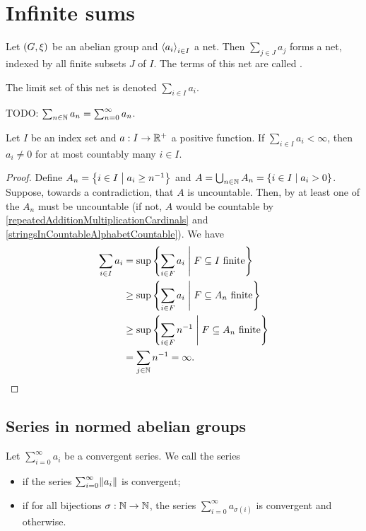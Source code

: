 \section{Infinite sums}
\begin{definition}
Let $\left( G,\xi \right)$ be an abelian group and $\left\langle a_i \right\rangle_{i\in I}$ a net. Then $\sum_{j\in J}a_j$ forms a net, indexed by all finite subsets $J$ of $I$. The terms of this net are called .

The limit set of this net is denoted $\sum_{i\in I} a_i$.
\end{definition}

\begin{lemma}
TODO: $\sum_{n\in\mathbb{N}}a_n = \sum_{n=0}^\infty a_n$.
\end{lemma}

\begin{proposition} \label{finiteSumsAreCountable}
Let $I$ be an index set and $a: I\to \mathbb{R}^+$ a positive function. If $\sum_{i\in I}a_i < \infty$, then $a_i\neq 0$ for at most countably many $i\in I$.
\end{proposition}
\begin{proof}
Define $A_n = \setbuilder{i\in I}{a_i \geq n^{-1}}$ and $A = \bigcup_{n\in \N}A_n = \setbuilder{i\in I}{a_i > 0}$. Suppose, towards a contradiction, that $A$ is uncountable. Then, by at least one of the $A_n$ must be uncountable (if not, $A$ would be countable by \ref{repeatedAdditionMultiplicationCardinals} and \ref{stringsInCountableAlphabetCountable}). We have
\begin{align*}
\sum_{i\in I}a_i &= \sup\setbuilder{\sum_{i\in F}a_i}{\text{$F\subseteq I$ finite}} \\
&\geq \sup\setbuilder{\sum_{i\in F}a_i}{\text{$F\subseteq A_n$ finite}} \\
&\geq \sup\setbuilder{\sum_{i\in F}n^{-1}}{\text{$F\subseteq A_n$ finite}} \\
&= \sum_{j\in \N}n^{-1} = \infty.
\end{align*}
\end{proof}

\subsection{Series in normed abelian groups}
\begin{definition}
Let $\sum_{i=0}^\infty a_i$ be a convergent series. We call the series
\begin{itemize}
\item {} if the series $\sum_{i=0}^\infty \lVert a_i\rVert$ is convergent;
\item {} if for all bijections $\sigma: \mathbb{N}\to \mathbb{N}$, the series $\sum_{i=0}^\infty a_{\sigma(i)}$ is convergent and  otherwise.
\end{itemize}
\end{definition}


